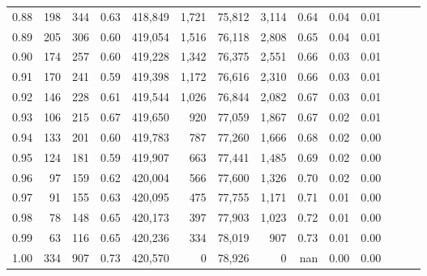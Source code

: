 \begin{tabular}{rrrrrrrrrrrrrr}
0.88 &     198 &    344 &  0.63 &  418,849 &    1,721 &  75,812 &   3,114 &  0.64 &  0.04 &      0.01 \\
0.89 &     205 &    306 &  0.60 &  419,054 &    1,516 &  76,118 &   2,808 &  0.65 &  0.04 &      0.01 \\
0.90 &     174 &    257 &  0.60 &  419,228 &    1,342 &  76,375 &   2,551 &  0.66 &  0.03 &      0.01 \\
0.91 &     170 &    241 &  0.59 &  419,398 &    1,172 &  76,616 &   2,310 &  0.66 &  0.03 &      0.01 \\
0.92 &     146 &    228 &  0.61 &  419,544 &    1,026 &  76,844 &   2,082 &  0.67 &  0.03 &      0.01 \\
0.93 &     106 &    215 &  0.67 &  419,650 &      920 &  77,059 &   1,867 &  0.67 &  0.02 &      0.01 \\
0.94 &     133 &    201 &  0.60 &  419,783 &      787 &  77,260 &   1,666 &  0.68 &  0.02 &      0.00 \\
0.95 &     124 &    181 &  0.59 &  419,907 &      663 &  77,441 &   1,485 &  0.69 &  0.02 &      0.00 \\
0.96 &      97 &    159 &  0.62 &  420,004 &      566 &  77,600 &   1,326 &  0.70 &  0.02 &      0.00 \\
0.97 &      91 &    155 &  0.63 &  420,095 &      475 &  77,755 &   1,171 &  0.71 &  0.01 &      0.00 \\
0.98 &      78 &    148 &  0.65 &  420,173 &      397 &  77,903 &   1,023 &  0.72 &  0.01 &      0.00 \\
0.99 &      63 &    116 &  0.65 &  420,236 &      334 &  78,019 &     907 &  0.73 &  0.01 &      0.00 \\
1.00 &     334 &    907 &  0.73 &  420,570 &        0 &  78,926 &       0 &   nan &  0.00 &      0.00 \\
\bottomrule
\end{tabular}
